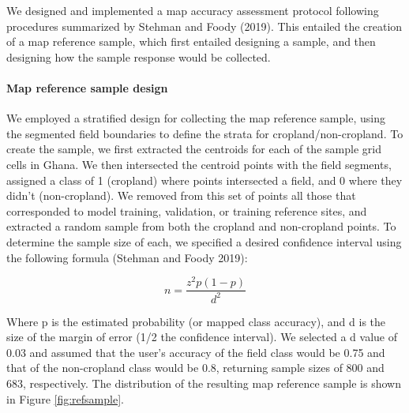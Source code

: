 \documentclass[
  11pt,
  a4paper]{article}
\begin{document}
We designed and implemented a map accuracy assessment protocol following
procedures summarized by Stehman and Foody (2019). This entailed the
creation of a map reference sample, which first entailed designing a
sample, and then designing how the sample response would be collected.

\hypertarget{map-reference-sample-design}{%
\paragraph{Map reference sample
design}\label{map-reference-sample-design}}

We employed a stratified design for collecting the map reference sample,
using the segmented field boundaries to define the strata for
cropland/non-cropland. To create the sample, we first extracted the
centroids for each of the sample grid cells in Ghana. We then
intersected the centroid points with the field segments, assigned a
class of 1 (cropland) where points intersected a field, and 0 where they
didn't (non-cropland). We removed from this set of points all those that
corresponded to model training, validation, or training reference sites,
and extracted a random sample from both the cropland and non-cropland
points. To determine the sample size of each, we specified a desired
confidence interval using the following formula (Stehman and Foody
2019):

\[n = \frac{z^2p(1-p)}{d^2}\]

Where p is the estimated probability (or mapped class accuracy), and d
is the size of the margin of error (1/2 the confidence interval). We
selected a d value of 0.03 and assumed that the user's accuracy of the
field class would be 0.75 and that of the non-cropland class would be
0.8, returning sample sizes of 800 and 683, respectively. The
distribution of the resulting map reference sample is shown in Figure
\ref{fig:refsample}.
\end{document}
